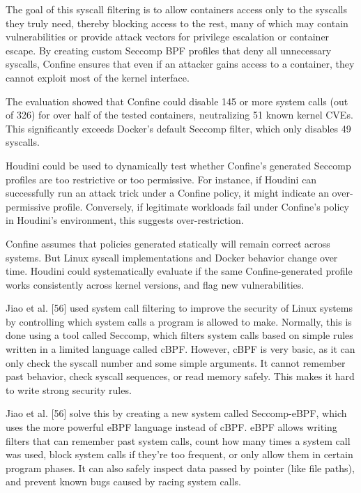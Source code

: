 \documentclass[12pt]{report}
\begin{document}
\begin{doublespace}
The goal of this syscall filtering is to allow containers access only to the syscalls they truly need, thereby blocking access to the rest, many of which may contain vulnerabilities or provide attack vectors for privilege escalation or container escape. By creating custom Seccomp BPF profiles that deny all unnecessary syscalls, Confine ensures that even if an attacker gains access to a container, they cannot exploit most of the kernel interface.

The evaluation showed that Confine could disable 145 or more system calls (out of 326) for over half of the tested containers, neutralizing 51 known kernel CVEs. This significantly exceeds Docker’s default Seccomp filter, which only disables 49 syscalls.

Houdini could be used to dynamically test whether Confine’s generated Seccomp profiles are too restrictive or too permissive. For instance, if Houdini can successfully run an attack trick under a Confine policy, it might indicate an over-permissive profile. Conversely, if legitimate workloads fail under Confine’s policy in Houdini’s environment, this suggests over-restriction.

Confine assumes that policies generated statically will remain correct across systems. But Linux syscall implementations and Docker behavior change over time. Houdini could systematically evaluate if the same Confine-generated profile works consistently across kernel versions, and flag new vulnerabilities.

Jiao et al. [56] used system call filtering to improve the security of Linux systems by controlling which system calls a program is allowed to make. Normally, this is done using a tool called Seccomp, which filters system calls based on simple rules written in a limited language called cBPF. However, cBPF is very basic, as it can only check the syscall number and some simple arguments. It cannot remember past behavior, check syscall sequences, or read memory safely. This makes it hard to write strong security rules.

Jiao et al. [56] solve this by creating a new system called Seccomp-eBPF, which uses the more powerful eBPF language instead of cBPF. eBPF allows writing filters that can remember past system calls, count how many times a system call was used, block system calls if they’re too frequent, or only allow them in certain program phases. It can also safely inspect data passed by pointer (like file paths), and prevent known bugs caused by racing system calls.


\end{doublespace}
\end{document}
